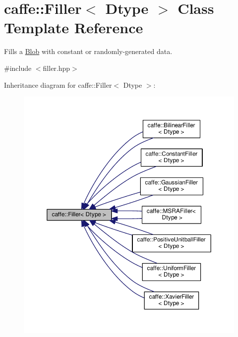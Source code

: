 \hypertarget{classcaffe_1_1_filler}{}\section{caffe\+:\+:Filler$<$ Dtype $>$ Class Template Reference}
\label{classcaffe_1_1_filler}


Fills a \mbox{\hyperlink{classcaffe_1_1_blob}{Blob}} with constant or randomly-\/generated data.  




{\ttfamily \#include $<$filler.\+hpp$>$}



Inheritance diagram for caffe\+:\+:Filler$<$ Dtype $>$\+:
\nopagebreak
\begin{figure}[H]
\begin{center}
\leavevmode
\includegraphics[width=350pt]{classcaffe_1_1_filler__inherit__graph}
\end{center}
\end{figure}
